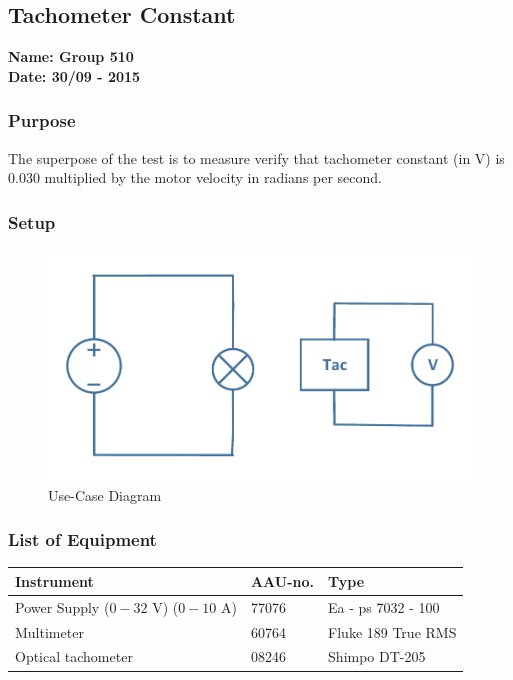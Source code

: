 \pagebreak
\subsection{Tachometer Constant} %
\textbf{Name: Group 510}\\
\textbf{Date: 30/09 - 2015}

\subsubsection{Purpose}
The superpose of the test is to measure verify that tachometer constant (in V) is 0.030 multiplied by the motor velocity in radians per second.

\subsubsection{Setup}
\begin{figure}[H]
  \centering
	\includegraphics[scale=0.5]{figures/MotorTest3.pdf}
	\caption{Use-Case Diagram}
	\flushleft
\end{figure}

\subsubsection{List of Equipment}

\begin{table}[H]
\begin{tabular}{|l|l|p{4cm}|}
\hline%
  \textbf{Instrument}                    &  \textbf{AAU-no.}  &  \textbf{Type}       \\
\hline%
  Power Supply ($0 - 32$ V) ($0 - 10$ A) &  77076             &  Ea - ps 7032 - 100  \\
\hline%
  Multimeter                             &  60764             &  Fluke 189 True RMS  \\
\hline%
  Optical tachometer                     &  08246             &  Shimpo DT-205       \\
\hline%
\end{tabular}
\end{table}

